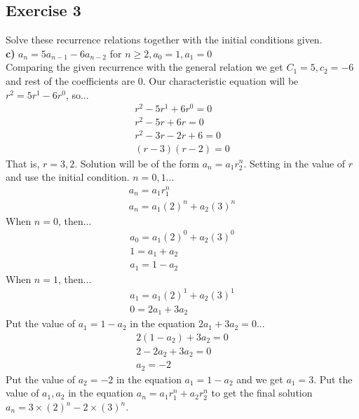 \documentclass[12pt]{article}
\begin{document}
    \subsection{Exercise 3} %
    Solve these recurrence relations together with the initial conditions given.\\
    \textbf{c)} $ a_n=5a_{n-1} - 6a_{n-2} $ for $ n \geq 2, a_0=1, a_1=0 $\\
    Comparing the given recurrence with the general relation we get $C_1=5,c_2=-6$ and rest of the coefficients are $0$.
    Our characteristic equation will be $r^2=5r^1-6r^0$, so...
    \begin{equation}
        \begin{split}
            r^2-5r^1+6r^0=0\\
            r^2-5r+6r=0\\
            r^2-3r-2r+6=0\\
            (r-3)(r-2)=0
        \end{split}
    \end{equation}
    That is, $r=3,2$.
    Solution will be of the form $a_n=a_1r_2^n$. Setting in the value of $r$ and use the initial condition.
    $n=0,1$...\\
    \begin{equation}
        \begin{split}
            a_n=a_1r_1^n\\
            a_n=a_1(2)^n+a_2(3)^n
        \end{split}
    \end{equation}
    When $n=0$, then...
    \begin{equation}
        \begin{split}
            a_0=a_1(2)^0+a_2(3)^0\\
            1=a_1+a_2\\
            a_1=1-a_2
        \end{split}
    \end{equation}
    When $n=1$, then...
    \begin{equation}
        \begin{split}
            a_1=a_1(2)^1+a_2(3)^1\\
            0=2a_1+3a_2
        \end{split}
    \end{equation}
    Put the value of $a_1=1-a_2$ in the equation $2a_1+3a_2=0$...
    \begin{equation}
        \begin{split}
            2(1-a_2)+3a_2=0\\
            2-2a_2+3a_2=0\\
            a_2=-2
        \end{split}
    \end{equation}
    Put the value of $a_2=-2$ in the equation $a_1=1-a_2$ and we get $a_1=3$.
    Put the value of $a_1,a_2$ in the equation $a_n=a_1r_1^n+a_2r_2^n$ to get the final solution $a_n=3 \times (2)^n-2 \times (3)^n$.
\end{document}
